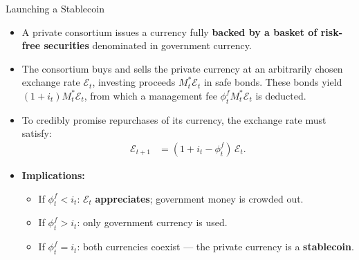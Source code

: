 \documentclass[11pt,aspectratio=169]{beamer}
\begin{document}
\begin{frame}{Launching a Stablecoin}
\small
\begin{itemize}

    \item A private consortium issues a currency fully \textbf{backed by a basket of risk-free securities} denominated in government currency.

    \vspace{0.6em}

    \item The consortium buys and sells the private currency at an arbitrarily chosen exchange rate $\mathcal{E}_t$, 
    investing proceeds $M_t^*\mathcal{E}_t$ in safe bonds.  
    These bonds yield $(1+i_t)M_t^*\mathcal{E}_t$, from which a management fee 
    $\phi_t^f M_t^*\mathcal{E}_t$ is deducted.

    \vspace{0.6em}

    \item To credibly promise repurchases of its currency, the exchange rate must satisfy:
    \begin{align}
        \mathcal{E}_{t+1} 
        &= (1 + i_t - \phi_t^f)\,\mathcal{E}_t.
        \tag{2.50}\label{2.50}
    \end{align}

    \vspace{0.8em}

    \item \textbf{Implications:}
    \begin{itemize}
        \item If $\phi_t^f < i_t$:  
              $\mathcal{E}_t$ \textbf{appreciates}; government money is crowded out.
        \item If $\phi_t^f > i_t$:  
              only government currency is used.
        \item If $\phi_t^f = i_t$:  
              both currencies coexist — the private currency is a \textbf{stablecoin}.
    \end{itemize}

\end{itemize}
\end{frame}
\end{document}
